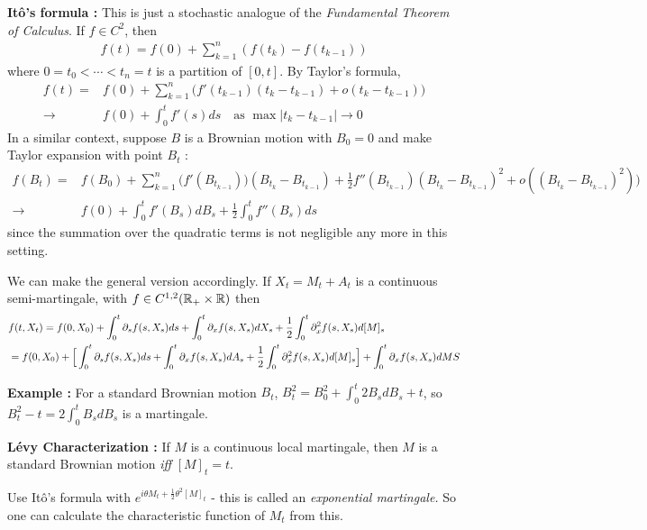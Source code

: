 \documentclass[12pt,a4paper]{article}
\newenvironment{proof}
{\begin{changemargin}{0.5cm}{0.5cm} 
	}%
	{\end{changemargin}
}
\newenvironment{p}
{\begin{proof} 
	}%
	{\end{proof}
}
\begin{document}
\textbf{It\^o's formula :} This is just a stochastic analogue of the \emph{Fundamental Theorem of Calculus}. If $f\in C^2$, then
\begin{align*}
f(t) = f(0) + \sum_{k=1}^n (f(t_k)- f(t_{k-1}))
\end{align*}
where $0=t_0 < \cdots < t_n =t$ is a partition of $[0,t]$. By Taylor's formula,
\begin{align*}
f(t) = & f(0) + \sum_{k=1}^n \big(f'(t_{k-1})(t_{k}- t_{k-1}) + o(t_k -t_{k-1})\big) \\
\rightarrow & f(0) + \int_0^t f'(s) ds \quad \text{as } \max |t_k -t_{k-1}| \rightarrow 0
\end{align*}
In a similar context, suppose $B$ is a Brownian motion with $B_0 =0$ and make Taylor expansion with point $B_t$ :
\begin{align*}
f(B_t) = & f(B_0) + \sum_{k=1}^n \big( f'(B_{t_{k-1}}))(B_{t_k} -B_{t_{k-1}}) + \frac{1}{2} f''(B_{t_{k-1}})(B_{t_k}-B_{t_{k-1}})^2 + o((B_{t_k} -B_{t_{k-1}})^2 )\big)  \\
\rightarrow & f(0) + \int_0^t f'(B_s) dB_s + \frac{1}{2} \int_0^t f''(B_s) ds
\end{align*}
since the summation over the quadratic terms is not negligible any more in this setting.

\quad We can make the general version accordingly. If $X_t = M_t + A_t$ is a continuous semi-martingale, with $f\in C^{1,2}(\mathbb{R}_{+}\times \mathbb{R})$ then
\begin{align*}
& f(t, X_t) = f(0, X_0) + \int_0^t \partial_s f(s, X_s) ds + \int_0^t \partial_x f(s, X_s) dX_s + \frac{1}{2} \int_0^t \partial_x^2 f(s, X_s) d[M]_s \\
& = f(0, X_0) + \Big[ \int_0^t \partial_s f(s, X_s)ds + \int_0^t \partial_x f(s, X_s)dA_s + \frac{1}{2} \int_0^t \partial_x^2 f(s, X_s) d[M]_s\Big] + \int_{0}^t \partial_x f(s, X_s) dMS
\end{align*}
\s

\textbf{Example :} For a standard Brownian motion $B_t$, $B_t^2 = B_0^2 + \int_0^t 2 B_s dB_s +t$, so $B_t^2 -t = 2\int_0^t B_s dB_s$ is a martingale.
\s

\textbf{L\'evy Characterization :} If $M$ is a continuous local martingale, then $M$ is a standard Brownian motion \emph{iff} $[M]_t =t$.
\begin{p}
\pf Use It\^o's formula with $e^{i\theta M_t + \frac{1}{2}\theta^2 [M]_t}$ - this is called an \emph{exponential martingale.} So one can calculate the characteristic function of $M_t$ from this.

\eop
\end{p}
\s
\end{document}

